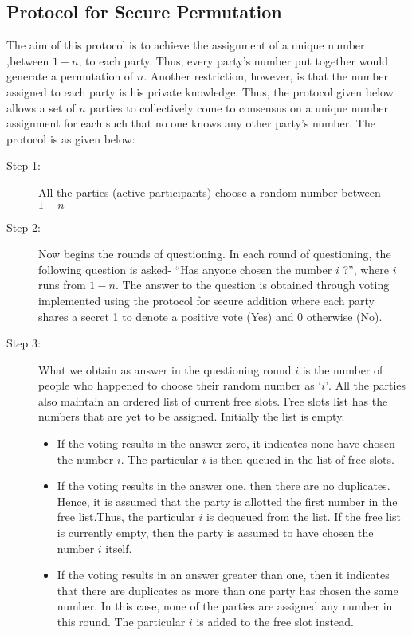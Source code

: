 \documentclass{llncs}
\begin{document}
\subsection{Protocol for Secure Permutation}
The aim of this protocol is to achieve the assignment of a unique number ,between $1-n$, to each party. Thus, every party's number put together would generate a permutation of $n$. Another restriction, however, is that the number assigned to each party is his private knowledge. Thus, the protocol given below allows a set of $n$ parties to collectively come to consensus on a unique number assignment for each such that no one knows any other party's number. The protocol is as given below:\\
\begin{description}
\item[Step 1:]\hspace{2mm} All the parties (active participants) choose a random number between $1 - n$
\item[Step 2:]\hspace{2mm} Now begins the rounds of questioning. In each round of questioning, the following question is asked- “Has anyone chosen the number $i$ ?”, where $i$ runs from $1-n$. The answer to the question is obtained through voting implemented using the protocol for secure addition where each party shares a secret 1 to denote a positive vote (Yes) and 0 otherwise (No).
\item[Step 3:]\hspace{2mm} What we obtain as answer in the questioning round $i$ is the number of people who happened to choose their random number as $‘i’$. All the parties also maintain an ordered list of current free slots. Free slots list has the numbers that are yet to be assigned. Initially the list is empty.
\begin{itemize}
\item If the voting results in the answer zero, it indicates none have chosen the number $i$. The particular $i$ is then queued in the list of free slots.
\item If the voting results in the answer one, then there are no duplicates. Hence, it is assumed that the party is allotted the first number in the free list.Thus, the particular $i$ is dequeued from the list. If the free list is currently empty, then the party is assumed to have chosen the number $i$ itself.
\item If the voting results in an answer greater than one, then it indicates that there are duplicates as more than one party has chosen the same number. In this case, none of the parties are assigned any number in this round. The particular $i$ is added to the free slot instead.

\end{itemize}
\end{description}
\end{document}
